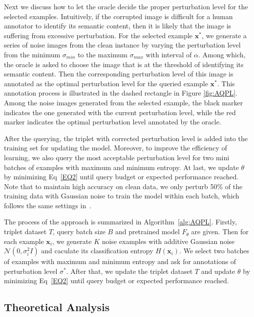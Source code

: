 \documentclass[letterpaper]{article} %
\begin{document}
Next we discuss how to let the oracle decide the proper perturbation level for the selected examples. Intuitively, if the corrupted image is difficult for a human annotator to identify its semantic content, then it is likely that the image is suffering from excessive perturbation. For the selected example $\mathbf{x}^*$, we generate a series of noise images from the clean instance by varying the perturbation level from the minimum $\sigma_{min}$ to the maximum $\sigma_{max}$ with interval of $\alpha$. Among which, the oracle is asked to choose the image that is at the threshold of identifying its semantic content. Then the corresponding perturbation level of this image is annotated as the optimal perturbation level for the queried example $\mathbf{x}^*$. This annotation process is illustrated in the dashed rectangle in Figure \ref{fig:AQPL}. Among the noise images generated from the selected example, the black marker indicates the one generated with the current perturbation level, while the red marker indicates the optimal perturbation level annotated by the oracle.

After the querying, the triplet with corrected perturbation level is added into the training set for updating the model.
Moreover, to improve the efficiency of learning, we also query the most acceptable perturbation level for two mini batches of examples with maximum and minimum entropy.
At last, we update $\theta$ by minimizing Eq~\ref{EQ2} until query budget or expected performance reached.
Note that to maintain high accuracy on clean data, we only perturb 50\% of the training data with Gaussian noise to train the model within each batch, which follows the same settings in~\cite{rusak2020increasing}.

The process of the approach is summarized in Algorithm~\ref{alg:AQPL}. Firstly, triplet dataset $T$, query batch size $B$ and pretrained model $F_\theta$ are given. Then for each example $\mathbf{x}_i$, we generate $K$ noise examples with additive Gaussian noise $\mathcal{N}(0,\sigma_i^2 I)$ and caculate its classification entropy $H(\mathbf{x}_i)$.
We select two batches of examples with maximum and minimum entropy and ask for annotations of perturbation level $\sigma^*$. After that, we update the triplet dataset $T$ and update $\theta$ by minimizing Eq~\ref{EQ2} until query budget or expected performance reached.

\subsection{Theoretical Analysis}
\end{document}
